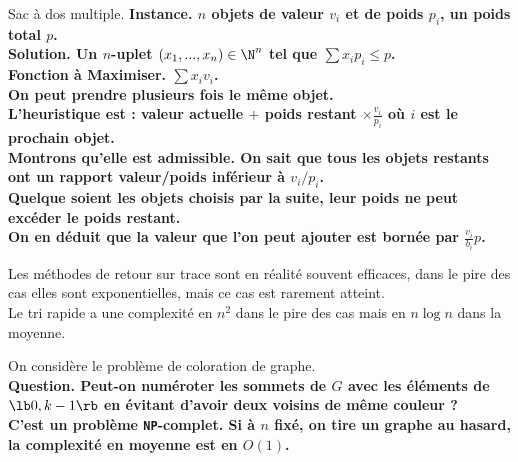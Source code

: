 \documentclass[french, 11pt]{article}
\begin{document}
\begin{ex}{Sac à dos multiple.}{}
    \bf{Instance.} $n$ objets de valeur $v_i$ et de poids $p_i$, un poids total $p$.\\
    \bf{Solution.} Un $n$-uplet $(x_1,...,x_n)\in\N^n$ tel que $\sum x_i p_i \leq p$.\\
    \bf{Fonction à Maximiser.} $\sum x_iv_i$.\\
    On peut prendre plusieurs fois le même objet.\\
    L'heuristique est : valeur actuelle $+$ poids restant $\times\frac{v_i}{p_i}$ où $i$ est le prochain objet.\\
    Montrons qu'elle est admissible. On sait que tous les objets restants ont un rapport valeur/poids inférieur à $v_i/p_i$.\\
    Quelque soient les objets choisis par la suite, leur poids ne peut excéder le poids restant.\\
    On en déduit que la valeur que l'on peut ajouter est bornée par $\frac{v_i}{b_i}p$.
\end{ex}

\begin{defi}{}{}
    Les méthodes de retour sur trace sont en réalité souvent efficaces, dans le pire des cas elles sont exponentielles, mais ce cas est rarement atteint.\\
    Le tri rapide a une complexité en $n^2$ dans le pire des cas mais en $n\log n$ dans la moyenne. 
\end{defi}

\begin{ex}{}{}
    On considère le problème de coloration de graphe.\\
    \bf{Question.} Peut-on numéroter les sommets de $G$ avec les éléments de $\lb0,k-1\rb$ en évitant d'avoir deux voisins de même couleur ?\\
    C'est un problème \texttt{NP}-complet.
    \tcblower
    Si à $n$ fixé, on tire un graphe au hasard, la complexité en moyenne est en $O(1)$.
\end{ex}
\end{document}
